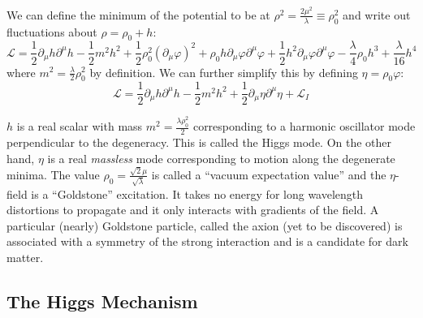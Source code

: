 \documentclass[a4paper,twoside,master.tex]{subfiles}
\begin{document}
We can define the minimum of the potential to be at $ \rho^2 = \frac{2 \mu^2}{\lambda} \equiv \rho_0^2 $ and write out fluctuations about $ \rho = \rho_0 + h $:
\begin{equation}
    \mathcal{L} = \frac{1}{2} \partial_{\mu} h \partial^{\mu} h - \frac{1}{2} m^2 h^2 + \frac{1}{2} \rho_0^2 (\partial_{\mu} \varphi)^2 + \rho_0 h \partial_{\mu} \varphi \partial^{\mu} \varphi + \frac{1}{2} h^2 \partial_{\mu} \varphi \partial^{\mu} \varphi - \frac{\lambda}{4} \rho_0 h^3 + \frac{\lambda}{16} h^4
\end{equation}
where $ m^2 = \frac{\lambda}{2} \rho_0^2 $ by definition. We can further simplify this by defining $ \eta = \rho_0 \varphi $:
\begin{equation}
    \mathcal{L} = \frac{1}{2} \partial_{\mu} h \partial^{\mu} h - \frac{1}{2} m^2 h^2 + \frac{1}{2} \partial_{\mu} \eta \partial^{\mu} \eta + \mathcal{L}_I
\end{equation}

$ h $ is a real scalar with mass $ m^2 = \frac{\lambda \rho_0^2}{2} $ corresponding to a harmonic oscillator mode perpendicular to the degeneracy. This is called the Higgs mode. On the other hand, $ \eta $ is a real \textit{massless} mode corresponding to motion along the degenerate minima. The value $ \rho_0 = \frac{\sqrt{2} \mu}{\sqrt{\lambda}} $ is called a ``vacuum expectation value'' and the $ \eta $-field is a ``Goldstone'' excitation. It takes no energy for long wavelength distortions to propagate and it only interacts with gradients of the field. A particular (nearly) Goldstone particle, called the axion (yet to be discovered) is associated with a symmetry of the strong interaction and is a candidate for dark matter.


\subsection{The Higgs Mechanism}\label{sub:the_higgs_mechanism}
\end{document}
